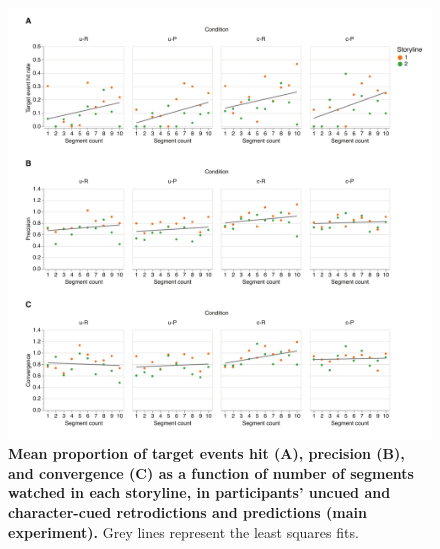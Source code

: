 \documentclass[10pt]{article}
\begin{document}
\begin{figure}[tp]
    \centering
    \includegraphics[width=\textwidth]{supp1}
    \caption{\textbf{Mean proportion of target events hit (A), precision (B), and convergence (C) as a function of number of segments watched in each storyline, in participants' uncued and character-cued retrodictions and predictions (main experiment).} Grey lines represent the least squares fits.}
    \label{fig:supp1}
\end{figure}
\end{document}
